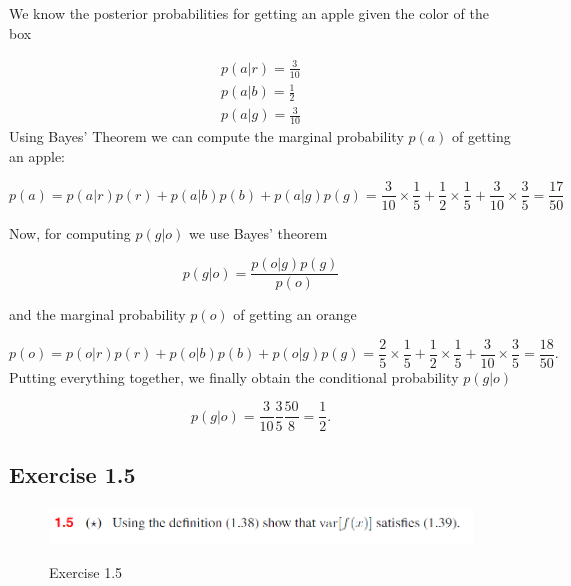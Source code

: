 \documentclass[11pt]{article}
\begin{document}
We know the posterior probabilities for getting an apple given the color of the box

\begin{align}
    p(a|r) = \frac{3}{10} \\
    p(a|b) = \frac{1}{2} \\
    p(a|g) = \frac{3}{10}
\end{align}
Using Bayes' Theorem we can compute the marginal probability $p(a)$ of getting an apple:

\begin{equation}
    p(a) = p(a|r) p(r) + p(a|b) p(b) + p(a|g) p(g) = \frac{3}{10} \times \frac{1}{5} + \frac{1}{2} \times \frac{1}{5} + \frac{3}{10} \times \frac{3}{5} = \frac{17}{50}
\end{equation}

Now, for computing $p(g|o)$ we use Bayes' theorem

\begin{equation}
    p(g|o) = \frac{p(o|g) p(g)}{p(o)}
\end{equation}

and the marginal probability $p(o)$ of getting an orange

\begin{equation}
    p(o) = p(o|r) p(r) + p(o|b) p(b) + p(o|g) p(g) = \frac{2}{5} \times \frac{1}{5} + \frac{1}{2} \times \frac{1}{5} + \frac{3}{10} \times \frac{3}{5} = \frac{18}{50}.
\end{equation}
Putting everything together, we finally obtain the conditional probability $p(g|o)$

\begin{equation}
    p(g|o) = \frac{3}{10} \frac{3}{5} \frac{50}{8} = \frac{1}{2}.
\end{equation}


\subsection{Exercise 1.5}

\begin{figure}[H]
\centering
        {\includegraphics[width=\linewidth]{ex1.5.png}}
        \caption{Exercise 1.5}\label{ex1.5}
        \label{ex1.5}
\end{figure}
\end{document}

